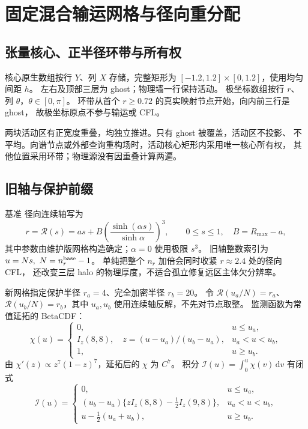 \documentclass[UTF8,fontset=fandol,11pt,a4paper]{ctexart}
\newcommand{\code}[1]{\texttt{\detokenize{#1}}}
\newcommand{\dd}{\,\mathrm d}
\begin{document}
\clearpage
\section{固定混合输运网格与径向重分配}
\subsection{张量核心、正半径环带与所有权}
核心原生数组按行 $Y$、列 $X$ 存储，完整矩形为
$[-1.2,1.2]\times[0,1.2]$，使用均匀间距 $h$。
左右及顶部三层为 ghost；物理墙一行保持活动。
极坐标数组按行 $r$、列 $\theta$，$\theta\in[0,\pi]$。
环带从首个 $r\ge0.72$ 的真实映射节点开始，向内前三行是 ghost，
故极坐标原点不参与输运或 CFL。

两块活动区有正宽度重叠，均独立推进。只有 ghost 被覆盖，活动区不投影、
不平均。向谱节点或外部查询重构场时，活动核心矩形内采用唯一核心所有权，
其他位置采用环带；物理源没有因重叠计算两遍。

\subsection{旧轴与保护前缀}
基准 \code{uniform_core} 径向连续轴写为
\begin{equation}
 r=\mathcal R(s)=as+B
 \left(\frac{\sinh(\alpha s)}{\sinh\alpha}\right)^3,\qquad
 0\le s\le1,\quad B=R_{\max}-a,
 \label{eq:baseaxis}
\end{equation}
其中参数由维护版网格构造确定；$\alpha=0$ 使用极限 $s^3$。
旧轴整数索引为 $u=Ns,\ N=n_r^{\rm base}-1$。
单纯把整个 $n_r$ 加倍会同时收紧 $r\approx2.4$ 处的径向 CFL，
还改变三层 halo 的物理厚度，不适合孤立修复远区主体欠分辨率。

新网格指定保护半径 $r_a=4$、完全加密半径 $r_b=20$。
令 $\mathcal R(u_a/N)=r_a$、$\mathcal R(u_b/N)=r_b$，其中
$u_a,u_b$ 使用连续轴反解，不先对节点取整。
监测函数为常值延拓的 BetaCDF：
\begin{equation}
 \chi(u)=
 \begin{cases}
 0,&u\le u_a,\\
 I_z(8,8),\quad z=(u-u_a)/(u_b-u_a),&u_a<u<u_b,\\
 1,&u\ge u_b.
 \end{cases}
\end{equation}
由 $\chi'(z)\propto z^7(1-z)^7$，延拓后的 $\chi$ 为 $C^7$。
积分 $\mathcal I(u)=\int_0^u\chi(v)\dd v$ 有闭式
\begin{equation}
 \mathcal I(u)=
 \begin{cases}
 0,&u\le u_a,\\
 (u_b-u_a)\{zI_z(8,8)-\tfrac12I_z(9,8)\},&u_a<u<u_b,\\
 u-\tfrac12(u_a+u_b),&u\ge u_b.
 \end{cases}
 \label{eq:cdf-integral}
\end{equation}
\end{document}
